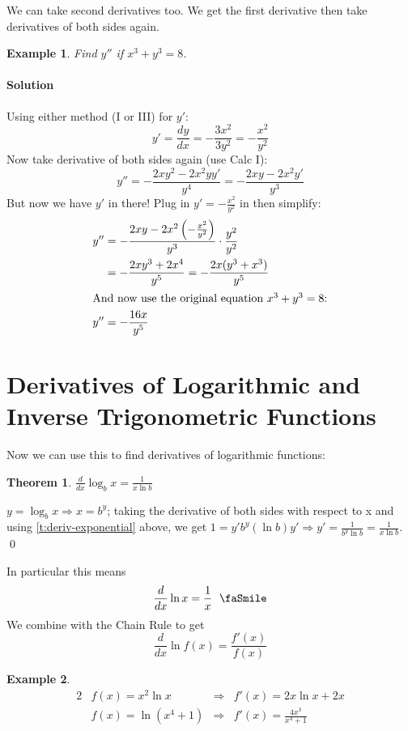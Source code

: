 \documentclass[letterpaper, 11pt, openany]{book}
\theoremstyle{mytheoremstyle}
\newtheorem{theorem}{Theorem}[section]
\renewenvironment{proof}{{\par \sffamily \smaller \fontseries{b}\selectfont Proof}}{\hfill\qed}
\theoremstyle{myexamplestyle}
\newtheorem{example}{Example}[section]
\newenvironment{solution}{\paragraph{\sffamily \smaller \fontseries{b}\selectfont Solution}}{\hfill\faSquare}
\begin{document}
We can take second derivatives too. We get the first derivative then take derivatives of both sides again.

\begin{example}
    Find \(y''\) if \(x^{3} + y^{3} = 8\).
\end{example}
\begin{solution}
    Using either method (I or III) for \(y'\):
    \[y' = \frac{dy}{dx} = - \frac{3x^{2}}{3y^{2}} = -\frac{x^{2}}{y^{2}}\]
    Now take derivative of both sides again (use Calc I):
    \[y'' = - \frac{2xy^{2} - 2x^{2}yy'}{y^{4}} = - \frac{2xy-2x^{2}y'}{y^{3}}\]
    But now we have \(y'\) in there! Plug in \(y' = -\frac{x^{2}}{y^{2}}\) in then simplify:
    \begin{align*}
        y'' &= - \frac{2xy-2x^{2}\left(-\frac{x^{2}}{y^{2}}\right)}{y^{3}}\cdot \frac{y^{2}}{y^{2}}\\
        &= - \frac{2xy^{3}+2x^{4}}{y^{5}} = - \frac{2x(y^{3} + x^{3})}{y^{5}}\\
        \intertext{And now use the original equation \(x^{3} + y^{3} = 8\):}
        y'' &= - \frac{16x}{y^{5}}
    \end{align*}
\end{solution}

\section{Derivatives of Logarithmic and Inverse Trigonometric Functions}


Now we can use this to find derivatives of logarithmic functions:

\begin{theorem}\label{t:deriv-ln-x}
    \(\frac{d}{dx} \log_{b} x = \frac{1}{x\ln b}\)
\end{theorem}
\begin{proof}
    \(y = \log_{b} x \Rightarrow x = b^{y}\); taking the derivative of both sides with respect to x and using \ref{t:deriv-exponential} above, we get \(1 = y'b^{y}(\ln b)y' \Rightarrow y' = \frac{1}{b^{y}\ln b} = \frac{1}{x\ln b}\).
\end{proof}

In particular this means
\[\frac{d}{dx} \ln x = \frac{1}{x} \text{\; \faSmile} \]
We combine with the Chain Rule to get
\[\frac{d}{dx} \ln f(x) = \frac{f'(x)}{f(x)}\]

\begin{example}
    \begin{alignat*}{2}
        &f(x) = x^{2}\ln x &\Rightarrow &f'(x) = 2x\ln x + 2x\\
        &f(x) = \ln (x^{4} + 1) &\Rightarrow &f'(x) = \frac{4x^{3}}{x^{4} + 1}
    \end{alignat*}
\end{example}
\end{document}
